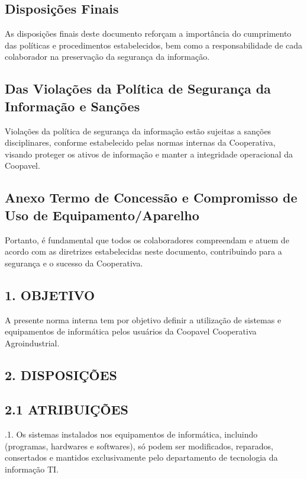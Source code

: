 \documentclass[letterpaper,10pt,brazil]{sphinxmanual}
\begin{document}
\subsection{Disposições Finais}
\label{\detokenize{regras:disposicoes-finais}}
\sphinxAtStartPar
As disposições finais deste documento reforçam a importância do cumprimento das
políticas e procedimentos estabelecidos, bem como a responsabilidade de cada
colaborador na preservação da segurança da informação.


\subsection{Das Violações da Política de Segurança da Informação e Sanções}
\label{\detokenize{regras:das-violacoes-da-politica-de-seguranca-da-informacao-e-sancoes}}
\sphinxAtStartPar
Violações da política de segurança da informação estão sujeitas a sanções disciplinares,
conforme estabelecido pelas normas internas da Cooperativa, visando proteger os ativos
de informação e manter a integridade operacional da Coopavel.


\subsection{Anexo \sphinxhyphen{} Termo de Concessão e Compromisso de Uso de Equipamento/Aparelho}
\label{\detokenize{regras:anexo-termo-de-concessao-e-compromisso-de-uso-de-equipamento-aparelho}}
\sphinxAtStartPar
Portanto, é fundamental que todos os colaboradores compreendam e atuem de acordo com
as diretrizes estabelecidas neste documento, contribuindo para a segurança e o sucesso da
Cooperativa.


\subsection{1. OBJETIVO}
\label{\detokenize{regras:objetivo}}
\sphinxAtStartPar
A presente norma interna tem por objetivo definir a utilização de sistemas e equipamentos
de informática pelos usuários da Coopavel Cooperativa Agroindustrial.


\subsection{2. DISPOSIÇÕES}
\label{\detokenize{regras:disposicoes}}

\subsection{2.1 ATRIBUIÇÕES}
\label{\detokenize{regras:id1}}
.1. Os sistemas instalados nos equipamentos de informática, incluindo (programas,
hardwares e softwares), só podem ser modificados, reparados, consertados e mantidos
exclusivamente pelo departamento de tecnologia da informação \sphinxhyphen{} TI.
\end{document}
